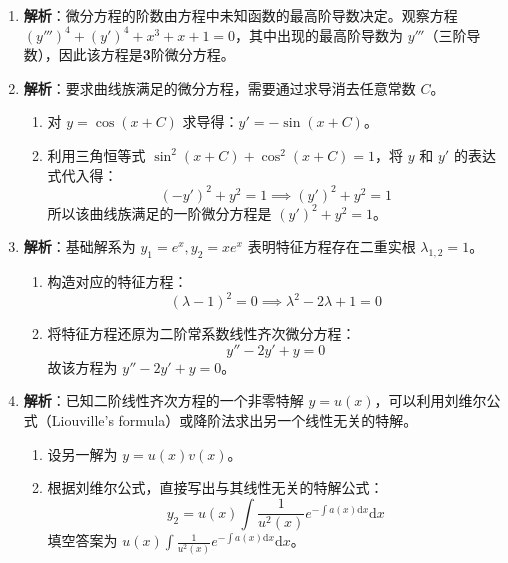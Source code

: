 \documentclass[lang=cn,11pt]{elegantbook}
\begin{document}
\begin{solution}
\begin{enumerate}
    \item[(1)] \textbf{解析}：微分方程的阶数由方程中未知函数的最高阶导数决定。观察方程 $(y''')^4+(y')^4+x^3+x+1=0$，其中出现的最高阶导数为 $y'''$（三阶导数），因此该方程是\textbf{3}阶微分方程。
    
    \item[(2)] \textbf{解析}：要求曲线族满足的微分方程，需要通过求导消去任意常数 $C$。
    \begin{enumerate}
        \item 对 $y=\cos(x+C)$ 求导得：$y'=-\sin(x+C)$。
        \item 利用三角恒等式 $\sin^2(x+C)+\cos^2(x+C)=1$，将 $y$ 和 $y'$ 的表达式代入得：
        \[
        (-y')^2 + y^2 = 1 \implies (y')^2 + y^2 = 1
        \]
        所以该曲线族满足的一阶微分方程是 \textbf{$(y')^2 + y^2 = 1$}。
    \end{enumerate}
    
    \item[(3)] \textbf{解析}：基础解系为 $y_1=e^x, y_2=xe^x$ 表明特征方程存在二重实根 $\lambda_{1,2}=1$。
    \begin{enumerate}
        \item 构造对应的特征方程：
        \[
        (\lambda-1)^2 = 0 \implies \lambda^2 - 2\lambda + 1 = 0
        \]
        \item 将特征方程还原为二阶常系数线性齐次微分方程：
        \[
        y'' - 2y' + y = 0
        \]
        故该方程为 \textbf{$y'' - 2y' + y = 0$}。
    \end{enumerate}
    
    \item[(4)] \textbf{解析}：已知二阶线性齐次方程的一个非零特解 $y=u(x)$，可以利用刘维尔公式（Liouville's formula）或降阶法求出另一个线性无关的特解。
    \begin{enumerate}
        \item 设另一解为 $y = u(x)v(x)$。
        \item 根据刘维尔公式，直接写出与其线性无关的特解公式：
        \[
        y_2 = u(x) \int \frac{1}{u^2(x)} e^{-\int a(x)\mathrm{d}x} \mathrm{d}x
        \]
        填空答案为 \textbf{$u(x) \int \frac{1}{u^2(x)} e^{-\int a(x)\mathrm{d}x} \mathrm{d}x$}。
    \end{enumerate}
    

\end{enumerate}
\end{solution}
\end{document}
